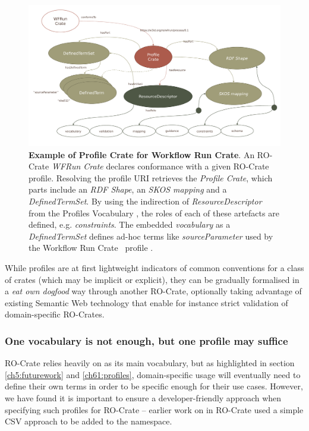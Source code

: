 \begin{figure}[htb]
    \includegraphics[width=\textwidth]{figures/ch09/profile-crate.pdf}
      \caption[Example of Profile Crate]{\textbf{Example of Profile Crate for Workflow Run Crate}. 
      An RO-Crate \emph{WFRun Crate} declares conformance with a given RO-Crate profile. 
      Resolving the profile URI retrieves the \emph{Profile Crate}, which parts include an \emph{RDF Shape}, an \emph{\acrshort{SKOS} mapping} and a \emph{DefinedTermSet}. 
      By using the indirection of \emph{ResourceDescriptor} from the Profiles Vocabulary \cite{Atkinson 2019}, the roles of each of these artefacts are defined, e.g. \emph{constraints}. 
      The embedded \emph{vocabulary} as a \emph{DefinedTermSet} defines ad-hoc terms like \emph{sourceParameter} used by the Workflow Run Crate\footnotemark~ profile \cite{Leo 2023b}.
      }
    \label{ch61:fig:profilecrate}
  \end{figure}

While profiles are at first lightweight indicators of common conventions for a class of crates (which may be implicit or explicit), they can be gradually formalised in a \emph{eat own dogfood} way through another RO-Crate, optionally taking advantage of existing Semantic Web technology that enable for instance strict validation of domain-specific RO-Crates.


\subsubsection{One vocabulary is not enough, but one profile may suffice}
\label{ch61:oneprofile}

RO-Crate relies heavily on \cite{schema.org} as its main vocabulary, but as highlighted in section \vref{ch5:futurework} and \vref{ch61:profiles}, domain-specific usage will eventually need to define their own terms in order to be specific enough for their use cases. However, we have found it is important to ensure a developer-friendly approach when specifying such profiles for RO-Crate -- earlier work on  in RO-Crate used a simple \acrshort{CSV} approach to be added to the  namespace.  

